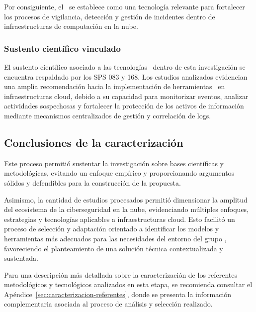 Por consiguiente, el \SIEM\ se establece como una tecnología relevante para fortalecer los procesos de vigilancia, detección y gestión de 
incidentes dentro de infraestructuras de computación en la nube.

\subsubsection{Sustento científico vinculado}

El sustento científico asociado a las tecnologías \SIEM\ dentro de esta investigación se encuentra respaldado por los SPS 083 y 168. Los 
estudios analizados evidencian una amplia recomendación hacia la implementación de herramientas \SIEM\ en infraestructuras cloud, debido a 
su capacidad para monitorizar eventos, analizar actividades sospechosas y fortalecer la protección de los activos de información mediante 
mecanismos centralizados de gestión y correlación de logs.
\subsection{Conclusiones de la caracterización}

Este proceso permitió sustentar la investigación sobre bases científicas y metodológicas, evitando un enfoque empírico y proporcionando 
argumentos sólidos y defendibles para la construcción de la propuesta.

Asimismo, la cantidad de estudios procesados permitió dimensionar la amplitud del ecosistema de la ciberseguridad en la nube, evidenciando 
múltiples enfoques, estrategias y tecnologías aplicables a infraestructuras cloud. Esto facilitó un proceso de selección y adaptación 
orientado a identificar los modelos y herramientas más adecuados para las necesidades del entorno del grupo \GRID, favoreciendo el 
planteamiento de una solución técnica contextualizada y sustentada.

Para una descripción más detallada sobre la caracterización de los referentes metodológicos y tecnológicos analizados en esta etapa, se 
recomienda consultar el Apéndice~\ref{sec:caracterizacion-referentes}, donde se presenta la información complementaria asociada al proceso de análisis y selección 
realizado.